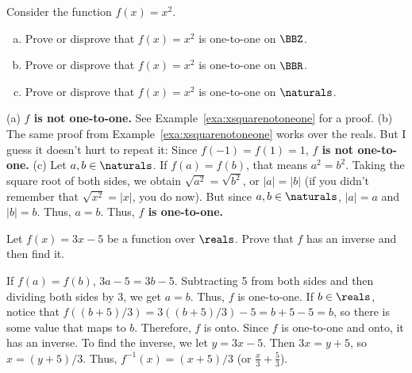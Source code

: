 \newpage
\begin{exer}
Consider the function $f(x)=x^2$.
\begin{enumerate}[(a)]
\item
Prove or disprove that $f(x)=x^2$ is one-to-one on $\BBZ$.

\noindent
\answerlinefour
\item
Prove or disprove that $f(x)=x^2$ is one-to-one on $\BBR$.

\noindent
\answerlinefour
\item
Prove or disprove that $f(x)=x^2$ is one-to-one on $\naturals$.

\noindent
\answerlinefour
\end{enumerate}
\begin{answer}
(a) {\bf $f$ is not one-to-one.}  See Example~\ref{exa:xsquarenotoneone} for a proof.
(b) The same proof from Example~\ref{exa:xsquarenotoneone} works over the reals.
But I guess it doesn't hurt to repeat it:  Since $f(-1)=f(1)=1$, {\bf $f$ is not one-to-one.}
(c) Let $a,b\in\naturals$.  If $f(a)=f(b)$, 
that means $a^2=b^2$. Taking the square root of both sides, we obtain $\sqrt{a^2}=\sqrt{b^2}$, or
$|a|=|b|$  (if you didn't remember that
$\sqrt{x^2}=|x|$, you do now).  
But since $a,b\in\naturals$, $|a|=a$ and $|b|=b$.  Thus, $a=b$.  Thus, {\bf $f$ is one-to-one.}
\end{answer}
\end{exer}

\begin{exer}
Let $f(x)=3x-5$ be a function over $\reals$.  
Prove that $f$ has an inverse and then find it.

\vspace*{2in}
\begin{answer}
If $f(a)=f(b)$, $3a-5=3b-5$.  Subtracting 5 from both sides and then dividing both sides by $3$,
we get $a=b$.  Thus, $f$ is one-to-one.  
If $b\in\reals$, notice that $f((b+5)/3)=3((b+5)/3)-5 = b+5-5=b$, so there is some value that maps
to $b$.  Therefore, $f$ is onto.  Since $f$ is one-to-one and onto, it has an inverse.
To find the inverse, we
let $y=3x-5$.  Then $3x=y+5$, so $x=(y+5)/3$.  Thus, $f^{-1}(x)=(x+5)/3$
(or $\frac{x}{3}+\frac{5}{3}$).
\end{answer}
\end{exer}


